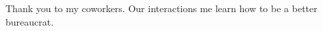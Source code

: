 \thispagestyle{empty}

Thank you to my coworkers. Our interactions me learn how to be a better bureaucrat.